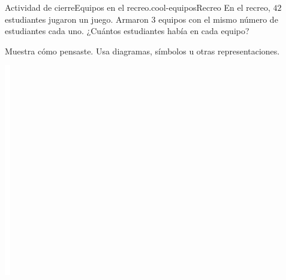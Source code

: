 \documentclass[14pt]{extarticle}
\begin{document}
\begin{project}{Actividad de cierre}{Equipos en el recreo.}{cool-equiposRecreo}%
En el recreo, \(42\) estudiantes jugaron un juego. Armaron \(3\) equipos con el mismo número de estudiantes cada uno. ¿Cuántos estudiantes había en cada equipo?%
\par
Muestra cómo pensaste. Usa diagramas, símbolos u otras representaciones.%
\begin{image}{0}{1}{0}{}%
\includegraphics[max width=\linewidth, center]{external/whitespace-tikz/6cm.pdf}
\end{image}%
\end{project}
\end{document}
